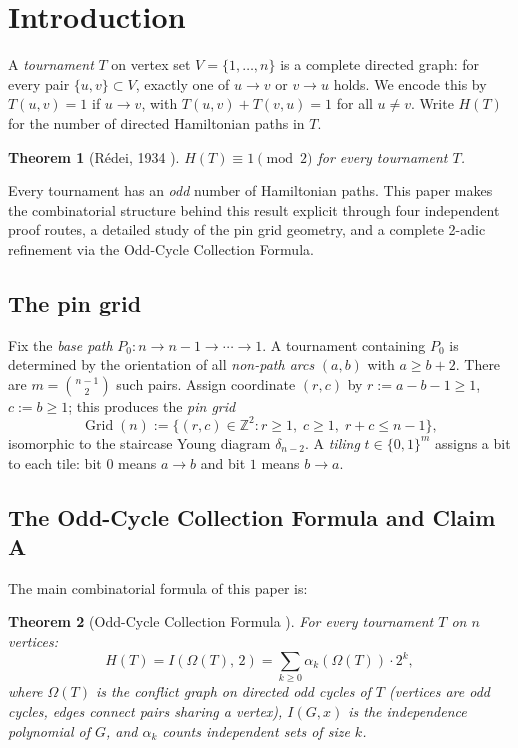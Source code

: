 \documentclass[12pt,reqno]{amsart}
\theoremstyle{plain}
\newtheorem{theorem}{Theorem}[section]
\theoremstyle{definition}
\theoremstyle{remark}
\DeclareMathOperator{\Grid}{Grid}
\begin{document}
\section{Introduction}
\label{sec:intro}

A \emph{tournament} $T$ on vertex set $V=\{1,\ldots,n\}$ is a complete directed
graph: for every pair $\{u,v\}\subset V$, exactly one of $u\to v$ or $v\to u$
holds. We encode this by $T(u,v)=1$ if $u\to v$, with $T(u,v)+T(v,u)=1$ for all
$u\ne v$. Write $H(T)$ for the number of directed Hamiltonian paths in $T$.

\begin{theorem}[Rédei, 1934 \cite{redei1934}]\label{thm:redei}
$H(T)\equiv 1\pmod{2}$ for every tournament $T$.
\end{theorem}

\noindent Every tournament has an \emph{odd} number of Hamiltonian paths.
This paper makes the combinatorial structure behind this result explicit through
four independent proof routes, a detailed study of the pin grid geometry, and a
complete 2-adic refinement via the Odd-Cycle Collection Formula.

\subsection{The pin grid}

Fix the \emph{base path} $P_0\colon n\to n{-}1\to\cdots\to 1$. A tournament
containing $P_0$ is determined by the orientation of all \emph{non-path arcs}
$(a,b)$ with $a\ge b+2$. There are $m=\binom{n-1}{2}$ such pairs. Assign
coordinate $(r,c)$ by $r:=a-b-1\ge 1$, $c:=b\ge 1$; this produces the
\emph{pin grid}
\[
  \Grid(n) := \{(r,c)\in\mathbb{Z}^2 : r\ge 1,\; c\ge 1,\; r+c\le n-1\},
\]
isomorphic to the staircase Young diagram $\delta_{n-2}$. A \emph{tiling}
$t\in\{0,1\}^m$ assigns a bit to each tile: bit $0$ means $a\to b$ and bit
$1$ means $b\to a$.

\subsection{The Odd-Cycle Collection Formula and Claim A}

The main combinatorial formula of this paper is:

\begin{theorem}[Odd-Cycle Collection Formula {\cite{grinberg2024}}]\label{thm:ocf_main}
For every tournament $T$ on $n$ vertices:
\[
  H(T) = I(\Omega(T),\,2) = \sum_{k\geq 0} \alpha_k(\Omega(T))\cdot 2^k,
\]
where $\Omega(T)$ is the conflict graph on directed odd cycles of $T$ (vertices
are odd cycles, edges connect pairs sharing a vertex), $I(G,x)$ is the
independence polynomial of $G$, and $\alpha_k$ counts independent sets of
size $k$.
\end{theorem}
\end{document}
